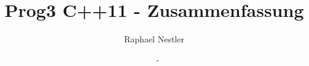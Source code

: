 \documentclass[ngerman,english]{scrartcl}
\title{Prog3 C++11 - Zusammenfassung}
\author{Raphael Nestler}
\date{\revisiondate ~ \revision-\revisionmodified}
\begin{document}
 
\twocolumn









\onecolumn

 
\end{document}
